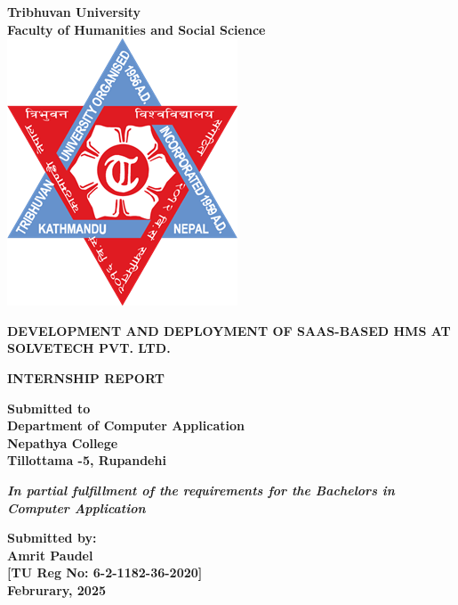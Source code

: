 \begin{titlepage}
    \centering
    {\fontsize{16}{19}\bfseries Tribhuvan University} \\
    {\fontsize{16}{19}\bfseries Faculty of Humanities and Social Science} \\

    \vspace{1.5cm}
    \includegraphics[scale=0.3]{contents/frontmatter/images/tu-logo.png} \\ 
    \vspace{1.5cm}

    {\fontsize{16}{19}\bfseries 
      DEVELOPMENT AND DEPLOYMENT OF SAAS-BASED HMS AT SOLVETECH PVT. LTD.} 
    \par

    {\fontsize{14}{17}\bfseries INTERNSHIP REPORT} \\

    \vspace{2cm}

    {\fontsize{14}{17}\bfseries Submitted to} \\
    {\fontsize{14}{17}\bfseries Department of Computer Application} \\
    {\fontsize{14}{17}\bfseries Nepathya College} \\
    {\fontsize{14}{17}\bfseries Tillottama -5, Rupandehi} \\

    \vspace{2cm}

    {\fontsize{14}{14}\bfseries \textit{In partial fulfillment of the requirements for the Bachelors in Computer Application}} \\

    \vspace{2cm}

    {\fontsize{14}{17}\bfseries Submitted by:} \\
    {\fontsize{14}{17}\bfseries Amrit Paudel} \\
    {\fontsize{14}{17}\bfseries [TU Reg No: 6-2-1182-36-2020]} \\

    \vfill
    {\fontsize{14}{17}\bfseries Februrary, 2025} 
\end{titlepage}

